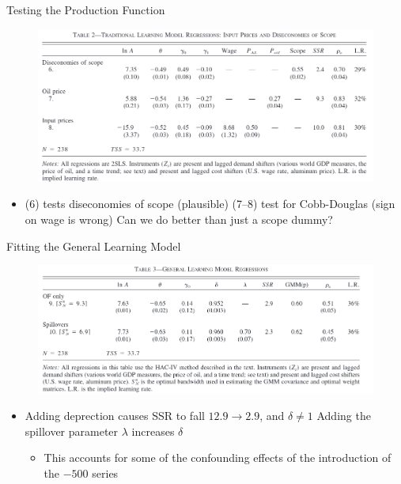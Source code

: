 \documentclass[dvipsnames]{beamer}
\begin{document}
\begin{frame}{Testing the Production Function}
  \begin{figure}[htp]
    \centering
    \includegraphics[width=\textwidth, keepaspectratio=true]{table2.png}
  \end{figure}
  \begin{itemize}
  \item (6) tests diseconomies of scope (plausible)
    \vitem (7--8) test for Cobb-Douglas (sign on wage is wrong)
    \vitem Can we do better than just a scope dummy?
  \end{itemize}
\end{frame}
%
\begin{frame}{Fitting the General Learning Model}
  \begin{figure}[htp]
    \centering
    \includegraphics[width=\textwidth, keepaspectratio=true]{table3.png}
  \end{figure}
  \begin{itemize}
  \item Adding deprection causes SSR to fall $12.9 \to 2.9$, and $\delta \ne 1$
    \vitem Adding the spillover parameter $\lambda$ increases $\delta$
    \begin{itemize}
    \item This accounts for some of the confounding effects of the introduction of the $-500$ series
    \end{itemize}
  \end{itemize}
\end{frame}
\end{document}
